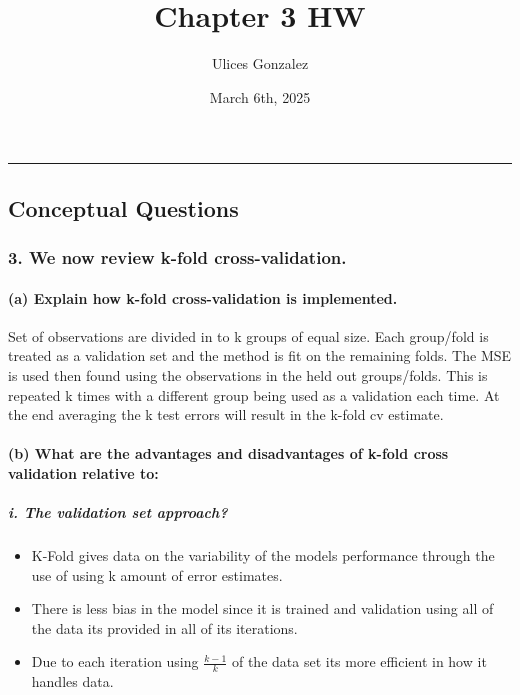 \documentclass[
]{article}
\title{Chapter 3 HW}
\author{Ulices Gonzalez}
\date{March 6th, 2025}
\providecommand{\tightlist}{%
  \setlength{\itemsep}{0pt}\setlength{\parskip}{0pt}}
\begin{document}
\maketitle

\begin{center}\rule{0.5\linewidth}{0.5pt}\end{center}

\subsection{Conceptual Questions}\label{conceptual-questions}

\subsubsection{3. We now review k-fold
cross-validation.}\label{we-now-review-k-fold-cross-validation.}

\paragraph{(a) Explain how k-fold cross-validation is
implemented.}\label{a-explain-how-k-fold-cross-validation-is-implemented.}

Set of observations are divided in to k groups of equal size. Each
group/fold is treated as a validation set and the method is fit on the
remaining folds. The MSE is used then found using the observations in
the held out groups/folds. This is repeated k times with a different
group being used as a validation each time. At the end averaging the k
test errors will result in the k-fold cv estimate.

\paragraph{(b) What are the advantages and disadvantages of k-fold cross
validation relative
to:}\label{b-what-are-the-advantages-and-disadvantages-of-k-fold-cross-validation-relative-to}

\subparagraph{i. The validation set
approach?}\label{i.-the-validation-set-approach}

\begin{itemize}
\tightlist
\item
  K-Fold gives data on the variability of the models performance through
  the use of using k amount of error estimates.
\item
  There is less bias in the model since it is trained and validation
  using all of the data its provided in all of its iterations.
\item
  Due to each iteration using \(\frac{k-1}{k}\) of the data set its more
  efficient in how it handles data.
\end{itemize}
\end{document}
